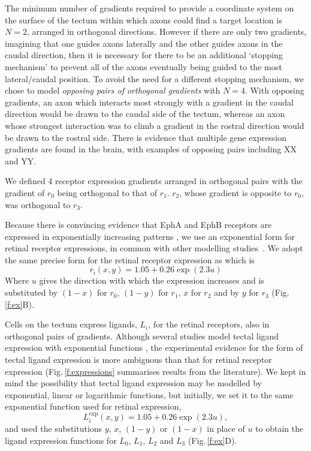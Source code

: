 \documentclass[11pt, a4paper]{article}
\begin{document}
The minimum number of gradients required to provide a coordinate system on the
surface of the tectum within which axons could find a target location is
$N=2$, arranged in orthogonal directions. However if there are only two
gradients, imagining that one guides axons laterally and the other guides
axons in the caudal direction, then it is necessary for there to be an
additional `stopping mechanism' to prevent all of the axons eventually being
guided to the most lateral/caudal position. To avoid the need for a different
stopping mechanism, we chose to model \emph{opposing pairs of orthogonal
gradients} with $N=4$. With opposing gradients, an axon which interacts most
strongly with a gradient in the caudal direction would be drawn to the caudal
side of the tectum, whereas an axon whose strongest interaction was to climb a
gradient in the rostral direction would be drawn to the rostral side. There is
evidence that multiple gene expression gradients are found in the brain, with
examples of opposing pairs including XX and YY.

We defined 4 receptor expression gradients arranged in orthogonal pairs
with the gradient of $r_0$ being orthogonal to that of $r_1$. $r_2$, whose
gradient is opposite to $r_0$, was orthogonal to $r_3$.

Because there is convincing evidence that EphA and EphB receptors are
expressed in exponentially increasing
patterns \citep{reber_relative_2004,feldheim_genetic_2000,brown_topographic_2000,koulakov_stochastic_2004},
we use an exponential form for retinal receptor expressions, in common with
other modelling
studies~\citep{reber_relative_2004,koulakov_stochastic_2004,simpson_simple_2011}.
We adopt the same precise form for the retinal receptor expression
as \citet{simpson_simple_2011} which is
\begin{equation} \label{e:retrcpt}
r_i(x,y) = 1.05 + 0.26 \exp(2.3 u)
\end{equation}
Where $u$ gives the direction with which the expression increases and is
substituted by $(1-x)$ for $r_0$, $(1-y)$ for $r_1$, $x$ for $r_2$ and by $y$ for
$r_3$ (Fig.\,\ref{f:ex}B).

Cells on the tectum express ligands, $L_i$, for the retinal receptors, also in
orthogonal pairs of gradients. Although several studies model tectal ligand
expression with exponential functions \citep{koulakov_stochastic_2004}, the
experimental evidence for the form of tectal ligand expression is more ambiguous than that for
retinal receptor expression (Fig.\,\ref{f:expressions} summarises results from
the literature). We kept in mind the
possibility that tectal ligand expression may be modelled by exponential,
linear or logarithmic functions, but initially, we set it to the same
exponential function used for retinal expression,
\begin{equation} \label{e:tecligexp}
L_i^{\text{exp}}(x,y) = 1.05 + 0.26 \exp(2.3 u),
\end{equation}
and used the substitutions $y$, $x$, $(1-y)$ or $(1-x)$ in place of $u$ to obtain
the ligand expression functions for $L_0$, $L_1$, $L_2$ and $L_3$
(Fig.\,\ref{f:ex}D).
\end{document}
